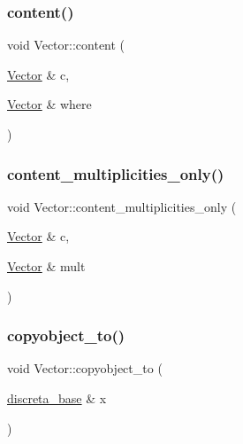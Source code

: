 \mbox{\label{class_vector_acebb5a8e10eb058e50bc373c0c478b0f}} 
\subsubsection{\texorpdfstring{content()}{content()}}
{\footnotesize\ttfamily void Vector\+::content (\begin{DoxyParamCaption}\item[{\mbox{\hyperlink{class_vector}{Vector}} \&}]{c,  }\item[{\mbox{\hyperlink{class_vector}{Vector}} \&}]{where }\end{DoxyParamCaption})}

\mbox{\label{class_vector_aab0e0006bfa41b63bcffd139c85d5c5d}} 
\subsubsection{\texorpdfstring{content\+\_\+multiplicities\+\_\+only()}{content\_multiplicities\_only()}}
{\footnotesize\ttfamily void Vector\+::content\+\_\+multiplicities\+\_\+only (\begin{DoxyParamCaption}\item[{\mbox{\hyperlink{class_vector}{Vector}} \&}]{c,  }\item[{\mbox{\hyperlink{class_vector}{Vector}} \&}]{mult }\end{DoxyParamCaption})}

\mbox{\label{class_vector_af657307f3d344c8cef5d633335a5f484}} 
\subsubsection{\texorpdfstring{copyobject\+\_\+to()}{copyobject\_to()}}
{\footnotesize\ttfamily void Vector\+::copyobject\+\_\+to (\begin{DoxyParamCaption}\item[{\mbox{\hyperlink{classdiscreta__base}{discreta\+\_\+base}} \&}]{x }\end{DoxyParamCaption})\hspace{0.3cm}{\ttfamily [virtual]}}



